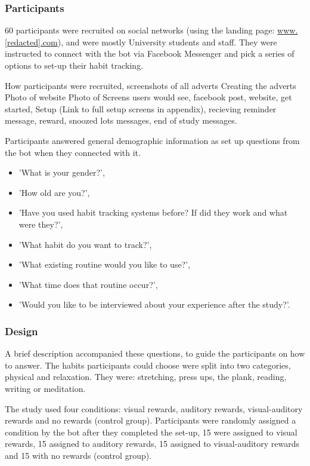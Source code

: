 \subsubsection{Participants}
60 participants were recruited on social networks (using the landing page: \url{www.[redacted].com}), and were mostly University students and staff. They were instructed to connect with the bot via Facebook Messenger and pick a series of options to set-up their habit tracking.

How participants were recruited, screenshots of all adverts\newline
Creating the adverts\newline
Photo of website\newline
Photo of Screens users would see, facebook post, website, get started, Setup (Link to full setup screens in appendix), recieving reminder message, reward, snoozed lots messages, end of study messages.\newline


Participants answered general demographic information as set up questions from the bot when they connected with it.

\begin{itemize}
  \item 'What is your gender?',
    \item 'How old are you?',
    \item 'Have you used habit tracking systems before? If did they work and what were they?',
    \item 'What habit do you want to track?',
    \item 'What existing routine would you like to use?',
    \item 'What time does that routine occur?',
    \item 'Would you like to be interviewed about your experience after the study?'.
\end{itemize}

\subsubsection{Design}
A brief description accompanied these questions, to guide the participants on how to answer. The habits participants could choose were split into two categories, physical and relaxation. They were: stretching, press ups, the plank, reading, writing or meditation.

The study used four conditions: visual rewards, auditory rewards, visual-auditory rewards and no rewards (control group). Participants were randomly assigned a condition by the bot after they completed the set-up, 15 were assigned to visual rewards, 15 assigned to auditory rewards, 15 assigned to visual-auditory rewards and 15 with no rewards (control group).

